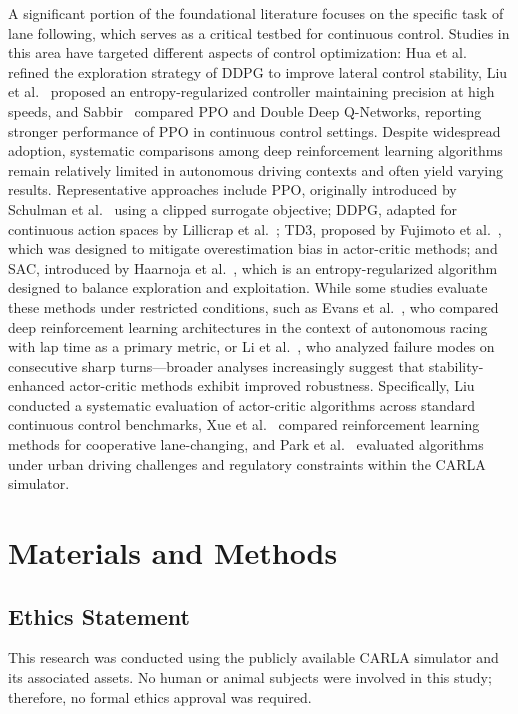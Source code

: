\documentclass[]{interact}
\begin{document}
A significant portion of the foundational literature focuses on the specific task of lane following, which serves as a critical testbed for continuous control. Studies in this area have targeted different aspects of control optimization: Hua et al.~\cite{hua2022exploration} refined the exploration strategy of DDPG to improve lateral control stability, Liu et al.~\cite{liu2024highspeed} proposed an entropy-regularized controller maintaining precision at high speeds, and Sabbir~\cite{sabbir2025comparative} compared PPO and Double Deep Q-Networks, reporting stronger performance of PPO in continuous control settings. Despite widespread adoption, systematic comparisons among deep reinforcement learning algorithms remain relatively limited in autonomous driving contexts and often yield varying results. Representative approaches include PPO, originally introduced by Schulman et al.~\cite{schulman2017proximal} using a clipped surrogate objective; DDPG, adapted for continuous action spaces by Lillicrap et al.~\cite{lillicrap2015continuous}; TD3, proposed by Fujimoto et al.~\cite{fujimoto2018addressing}, which was designed to mitigate overestimation bias in actor-critic methods; and SAC, introduced by Haarnoja et al.~\cite{haarnoja2019sac}, which is an entropy-regularized algorithm designed to balance exploration and exploitation. While some studies evaluate these methods under restricted conditions, such as Evans et al.~\cite{evans2024racing}, who compared deep reinforcement learning architectures in the context of autonomous racing with lap time as a primary metric, or Li et al.~\cite{li2025sharpturns}, who analyzed failure modes on consecutive sharp turns—broader analyses increasingly suggest that stability-enhanced actor-critic methods exhibit improved robustness. Specifically, Liu~\cite{liu2024evaluation} conducted a systematic evaluation of actor-critic algorithms across standard continuous control benchmarks, Xue et al.~\cite{xu2024lanechanging} compared reinforcement learning methods for cooperative lane-changing, and Park et al.~\cite{park2025comparative} evaluated algorithms under urban driving challenges and regulatory constraints within the CARLA simulator.

\section{Materials and Methods}
\label{sec:materialsmethods}

\subsection{Ethics Statement}
This research was conducted using the publicly available CARLA simulator and its associated assets. No human or animal subjects were involved in this study; therefore, no formal ethics approval was required.
\end{document}
